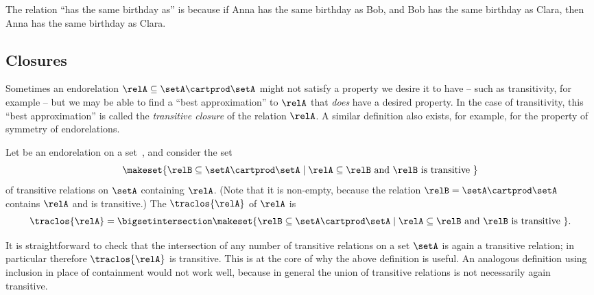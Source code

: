 \begin{example}
    The relation ``has the same birthday as'' is  because if Anna has the same birthday as Bob, and Bob has the same birthday as Clara, then Anna has the same birthday as Clara.
\end{example}


\subsection{Closures}

Sometimes an endorelation $\relA \subseteq \setA \cartprod \setA$ might not satisfy a property we desire it to have -- such as transitivity, for example -- but we may be able to find a ``best approximation'' to $\relA$ that \emph{does} have a desired property. In the case of transitivity, this ``best approximation'' is called the \emph{transitive closure} of the relation $\relA$. A similar definition also exists, for example, for the property of symmetry of endorelations. 

\begin{ctdefinition}
    \label{def:transitive-closure}
    Let \relA be an endorelation on a set~\setA, and consider the set
    \begin{equation}
\makeset{ \relB \subseteq \setA \cartprod \setA \mid \relA \subseteq \relB \text{ and } \relB \text{ is transitive } } 
\end{equation}
of transitive relations on $\setA$ containing $\relA$. (Note that it is non-empty, because the relation $\relB = \setA \cartprod \setA$ contains $\relA$ and is transitive.) The  $\traclos{\relA}$ of $\relA$ is
\begin{equation}
\traclos{\relA} = \bigsetintersection \makeset{ \relB \subseteq \setA \cartprod \setA \mid \relA \subseteq \relB \text{ and } \relB \text{ is transitive } }. 
\end{equation}
\end{ctdefinition}

\begin{remark}
It is straightforward to check that the intersection of any number of transitive relations on a set $\setA$ is again a transitive relation; in particular therefore $\traclos{\relA}$ is transitive. This is at the core of why the above definition is useful. An analogous definition using inclusion in place of containment would not work well, because in general the union of transitive relations is not necessarily again transitive. 
\end{remark}


